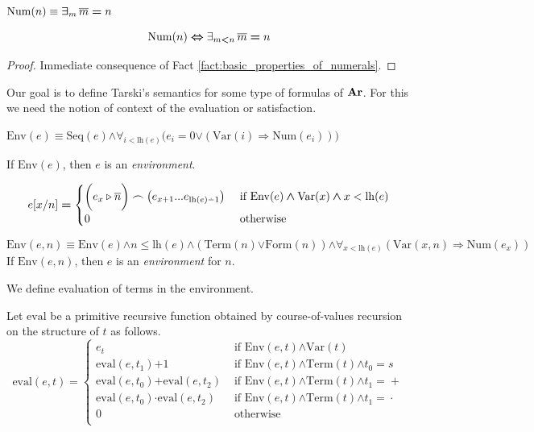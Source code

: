 \documentclass[10pt]{amsart}
\newcommand{\mforall}{\boldsymbol{\forall}}
\newcommand{\mexists}{\boldsymbol{\exists}}
\newcommand{\mra}{\boldsymbol{\Rightarrow}}
\newcommand{\mequiv}{\boldsymbol{\Leftrightarrow}}
\newcommand{\mand}{\boldsymbol{\wedge}}
\newcommand{\mor}{\boldsymbol{\vee}}
\newcommand{\mle}{\boldsymbol{<}}
\newcommand{\mleq}{\boldsymbol{\leq}}
\newcommand{\meq}{\boldsymbol{=}}
\newcommand{\mplus}{\boldsymbol{+}}
\newcommand{\mdot}{\boldsymbol{\cdot}}
\begin{document}
\begin{definition}
  $\mathrm{Num}(n) \equiv \mexists_m\,\ol{m} \meq n$
\end{definition}

\begin{fact}\label{fact:being_a_numeral_is_primitive_recursive_formula}
  $$\mathrm{Num}(n) \mequiv \exists_{m \mle n}\,\ol{m} \meq n$$ 
\end{fact}
\begin{proof}
  Immediate consequence of Fact \ref{fact:basic_properties_of_numerals}.
\end{proof}
\noindent
Our goal is to define Tarski's semantics for some type of formulas of $\mathbf{Ar}$. For this we need the notion of context of the evaluation or satisfaction.

\begin{definition}
  $\mathrm{Env}(e) \equiv \mathrm{Seq}(e) \mand \mforall_{i < \mathrm{lh}(e)}\big(e_i \meq 0 \mor \left(\mathrm{Var}(i) \mra \mathrm{Num}(e_i)\right)\big)$

  If $\mathrm{Env}(e)$, then $e$ is an \textit{environment}.
\end{definition}

\begin{definition}
  $$e[x/n] \meq \begin{cases}
    \bigg(e_x \triangleright \ol{n}\bigg) \frown \left(e_{x+1}...e_{\mathrm{lh}(e) \dotminus 1}\right)&\mbox{ if }\mathrm{Env}(e) \mand \mathrm{Var}(x) \mand x < \mathrm{lh}(e)\\
    0&\mbox{ otherwise }
  \end{cases}
  $$
\end{definition}

\begin{definition}
  $$\mathrm{Env}(e,n) \equiv \mathrm{Env}(e) \mand n \mleq \mathrm{lh}(e) \mand \left(\mathrm{Term}(n) \mor \mathrm{Form}(n)\right) \mand \mforall_{x \mle \mathrm{lh}(e)}\left(\mathrm{Var}(x,n) \mra \mathrm{Num}(e_x)\right)$$
  If $\mathrm{Env}(e,n)$, then $e$ is an \textit{environment} for $n$.
\end{definition}
\noindent
We define evaluation of terms in the environment.

\begin{definition}
  Let $\mathrm{eval}$ be a primitive recursive function obtained by course-of-values recursion on the structure of $t$ as follows.
  $$\mathrm{eval}(e,t) \meq \begin{cases}
    e_t&\mbox{ if }\mathrm{Env}(e,t) \mand \mathrm{Var}(t)\\
    \mathrm{eval}(e, t_1) \mplus 1&\mbox{ if }\mathrm{Env}(e,t) \mand \mathrm{Term}(t) \mand t_0 \meq s\\ 
    \mathrm{eval}(e, t_0) \mplus \mathrm{eval}(e,t_2)&\mbox{ if }\mathrm{Env}(e,t) \mand \mathrm{Term}(t) \mand t_1 \meq +\\ 
    \mathrm{eval}(e, t_0) \mdot \mathrm{eval}(e, t_2)&\mbox{ if }\mathrm{Env}(e,t) \mand \mathrm{Term}(t) \mand t_1 \meq \cdot\\
    0&\mbox{ otherwise }\\
  \end{cases}$$
\end{definition}
\end{document}
